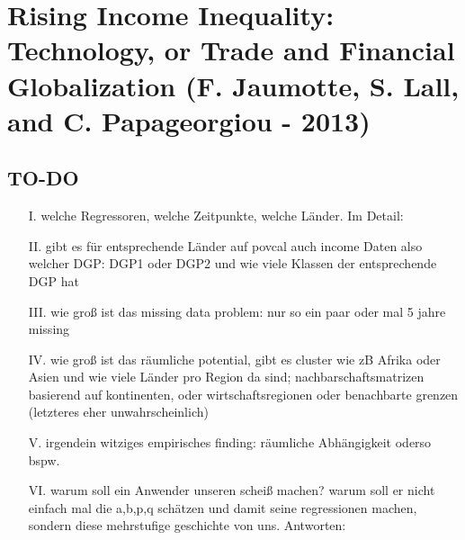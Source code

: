 \section{Rising Income Inequality: Technology, or Trade and Financial Globalization (F. Jaumotte, S. Lall, and C. Papageorgiou - 2013)}
\subsection*{TO-DO}
\begin{itemize}
\item[I.] welche Regressoren, welche Zeitpunkte, welche Länder. Im Detail:
\item[II.]  gibt es für entsprechende Länder auf povcal auch income Daten also welcher DGP: DGP1 oder DGP2 und wie viele Klassen der entsprechende DGP hat
\item[III.] wie groß ist das missing data problem: nur so ein paar oder mal 5 jahre missing
\item[IV.] wie groß ist das räumliche potential, gibt es cluster wie zB Afrika oder Asien und wie viele Länder pro Region da sind; nachbarschaftsmatrizen basierend auf kontinenten, oder wirtschaftsregionen oder benachbarte grenzen (letzteres eher unwahrscheinlich)
\item[V.] irgendein witziges empirisches finding: räumliche Abhängigkeit oderso bspw.
\item[VI.] warum soll ein Anwender unseren scheiß machen? warum soll er nicht einfach mal die a,b,p,q schätzen und damit seine regressionen machen, sondern diese mehrstufige geschichte von uns. Antworten:

\end{itemize}
